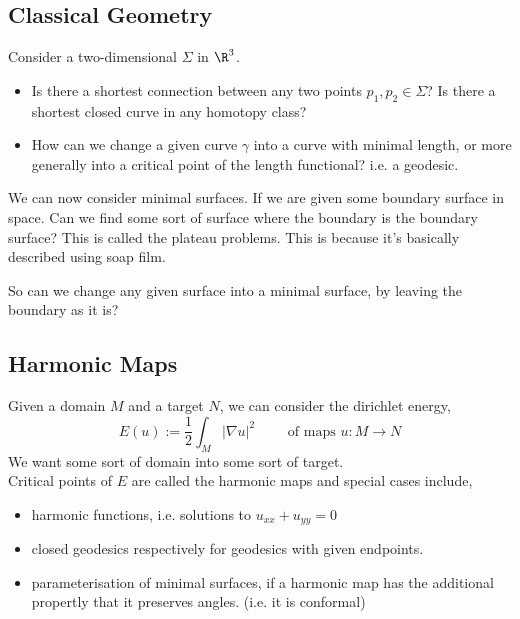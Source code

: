 \documentclass{article}
\begin{document}
\subsection{Classical Geometry}
Consider a two-dimensional $\Sigma$ in $\R^3$.
\begin{itemize}
  \item Is there a shortest connection between any two points $p_1, p_2 \in \Sigma$? Is there a shortest closed curve in any homotopy class?
  \item How can we change a given curve $\gamma$ into a curve with minimal length, or more generally into a critical point of the length functional? i.e. a geodesic.
\end{itemize}

\noindent
We can now consider minimal surfaces. If we are given some boundary surface in space. Can we find some sort of surface where the boundary is the boundary surface? This is called the plateau problems. This is because it's basically described using soap film.

\noindent
So can we change any given surface into a minimal surface, by leaving the boundary as it is?

\subsection{Harmonic Maps}
Given a domain $M$ and a target $N$, we can consider the dirichlet energy,
$$ E(u) := \frac{1}{2}\int_M |\nabla u|^2 \qquad \text{ of maps $u : M \to N$}$$
We want some sort of domain into some sort of target.\\

Critical points of $E$ are called the harmonic maps and special cases include,
\begin{itemize}
  \item harmonic functions, i.e. solutions to $u_{xx} + u_{yy} =0$
  \item closed geodesics respectively for geodesics with given endpoints.
  \item parameterisation of minimal surfaces, if a harmonic map has the additional propertly that it preserves angles. (i.e. it is conformal)
\end{itemize}
\end{document}
